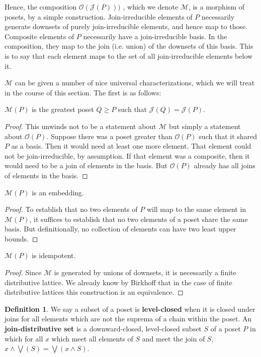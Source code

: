 \documentclass[hoptionsi,review,format=sigplan]{acmart}
\theoremstyle{definition}
\newtheorem{definition}{Definition}[section]
\newcommand{\Mcc}{\mathcal{M}}
\newcommand{\Oc}{\mathcal{O}}
\newcommand{\Jc}{\mathcal{J}}
\begin{document}
Hence, the composition \(\Oc(\Jc(P)))\) , which we denote \(\Mcc\), is a morphism of posets, by a simple construction. Join-irreducible elements of \(P\) necessarily generate downsets of purely join-irreducible elements, and hence map to those. Composite elements of \(P\) necessarily have a join-irreducible basis. In the composition, they map to the join (i.e. union) of the downsets of this basis. This is to say that each element maps to the set of all join-irreducible elements below it. 

\(\Mcc\) can be given a number of nice universal characterizations, which we will treat in the course of this section. The first is as follows:

\begin{lemma}
\(\Mcc(P)\) is the greatest poset \(Q \ge P\) such that \(\Jc(Q) = \Jc(P)\).
\end{lemma}
\begin{proof}
This unwinds not to be a statement about \(\Mcc\) but simply a statement about \(\Oc(P)\).  Suppose there was a poset greater than \(\Oc(P)\) such that it shared \(P\) as a basis. Then it would need at least one more element. That element could not be join-irreducible, by assumption. If that element was a composite, then it would need to be a join of elements in the basis. But \(\Oc(P)\) already has all joins of elements in the basis.
\end{proof}

\begin{lemma}
\(\Mcc(P)\) is an embedding.
\end{lemma}
\begin{proof}
To establish that no two elements of \(P\) will map to the same element in \(\Mcc(P)\), it suffices to establish that no two elements of a poset share the same basis. But definitionally, no collection of elements can have two least upper bounds.
\end{proof}

\begin{lemma}
\(\Mcc(P)\) is idempotent.
\end{lemma}
\begin{proof}
Since \(\Mcc\) is generated by unions of downsets, it is necessarily a finite distributive lattice. We already know by Birkhoff that in the case of finite distributive lattices this construction is an equivalence.
\end{proof}

\begin{definition}
We say a subset of a poset is \textbf{level-closed} when it is closed under joins for all elements which are not the suprema of a chain within the poset. An \textbf{join-distributive set} is a downward-closed, level-closed subset \(S\) of a poset \(P\) in which for all \(x\) which meet all elements of \(S\) and meet the join of \(S\), \(x \wedge \bigvee(S) = \bigvee(x \wedge S)\).
\end{definition}
\end{document}
